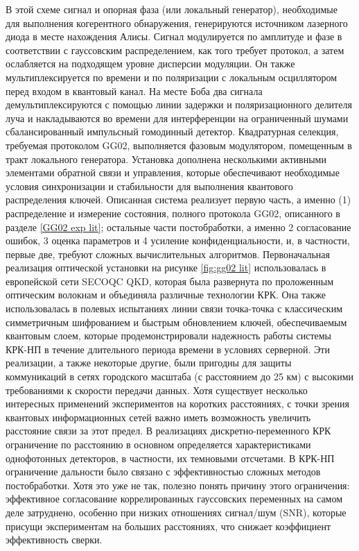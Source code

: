 В этой схеме сигнал и опорная фаза (или локальный генератор), необходимые для выполнения когерентного обнаружения, генерируются источником лазерного диода в месте нахождения Алисы. Сигнал модулируется по амплитуде и фазе в соответствии с гауссовским распределением, как того требует протокол, а затем ослабляется на подходящем уровне дисперсии модуляции. Он также мультиплексируется по времени и по поляризации с локальным осциллятором перед входом в квантовый канал. На месте Боба два сигнала демультиплексируются с помощью линии задержки и поляризационного делителя луча и накладываются во времени для интерференции на ограниченный шумами сбалансированный импульсный гомодинный детектор. Квадратурная селекция, требуемая протоколом GG02, выполняется фазовым модулятором, помещенным в тракт локального генератора. Установка дополнена несколькими активными элементами обратной связи и управления, которые обеспечивают необходимые условия синхронизации и стабильности для выполнения квантового распределения ключей. 
Описанная система реализует первую часть, а именно (1) распределение и измерение состояния, полного протокола GG02, описанного в разделе \ref{GG02 exp lit}; остальные части постобработки, а именно 2 согласование ошибок, 3 оценка параметров и 4 усиление конфиденциальности, и, в частности, первые две, требуют сложных вычислительных алгоритмов. Первоначальная реализация оптической установки на рисунке \ref{fig:gg02 lit} использовалась в европейской сети SECOQC QKD, которая была развернута по проложенным оптическим волокнам и объединяла различные технологии КРК. Она также использовалась в полевых испытаниях линии связи точка-точка с классическим симметричным шифрованием и быстрым обновлением ключей, обеспечиваемым квантовым слоем, которые продемонстрировали надежность работы системы КРК-НП в течение длительного периода времени в условиях серверной. Эти реализации, а также некоторые другие, были пригодны для защиты коммуникаций в сетях городского масштаба (с расстоянием до 25 км) с высокими требованиями к скорости передачи данных. Хотя существует несколько интересных применений экспериментов на коротких расстояниях, с точки зрения квантовых информационных сетей важно иметь возможность увеличить расстояние связи за этот предел. В реализациях дискретно-переменного КРК ограничение по расстоянию в основном определяется характеристиками однофотонных детекторов, в частности, их темновыми отсчетами. В КРК-НП ограничение дальности было связано с эффективностью сложных методов постобработки. Хотя это уже не так, полезно понять причину этого ограничения: эффективное согласование коррелированных гауссовских переменных на самом деле затруднено, особенно при низких отношениях сигнал/шум (SNR), которые присущи экспериментам на больших расстояниях, что снижает коэффициент эффективность сверки. 
